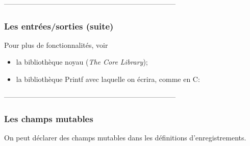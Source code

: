------------------------------------------------------------------------
%
\begin{frame}
\frametitle{Les entrées/sorties (suite)}

Pour plus de fonctionnalités, voir
\begin{itemize}

  \item la bibliothèque noyau (\emph{The Core Library});

  \item la bibliothèque \textsf{Printf} avec laquelle on écrira,
        comme en C:\\

\end{itemize}

\end{frame}

------------------------------------------------------------------------
%
\begin{frame}
\frametitle{Les champs mutables}

On peut déclarer des champs mutables dans les définitions
d'enregistrements.


\\
\\
\\
\\
\\

\end{frame}

